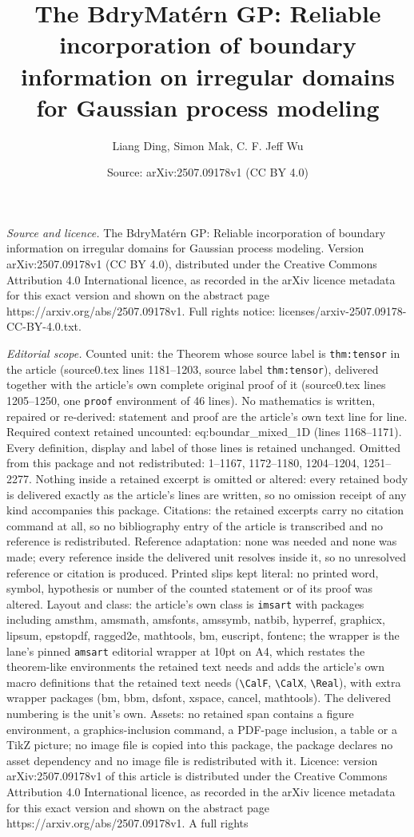 \documentclass[10pt,a4paper]{amsart}
\title[The BdryMat\'ern GP: Reliable incorporation of boundary info]{The BdryMat\'ern GP: Reliable incorporation of boundary information on irregular domains for Gaussian process modeling}
\author{Liang Ding, Simon Mak, C. F. Jeff Wu}
\date{Source: arXiv:2507.09178v1 (CC BY 4.0)}
\begin{document}
\maketitle

\noindent\emph{Source and licence.} The BdryMat\'ern GP: Reliable incorporation of boundary information on irregular domains for Gaussian process modeling. Version arXiv:2507.09178v1 (CC BY 4.0), distributed under the Creative Commons Attribution 4.0 International licence, as recorded in the arXiv licence metadata for this exact version and shown on the abstract page https://arxiv.org/abs/2507.09178v1. Full rights notice: licenses/arxiv-2507.09178-CC-BY-4.0.txt.\par\smallskip

\noindent\textit{Editorial scope.} Counted unit: the Theorem whose source label is \texttt{thm:tensor} in the article (source0.tex lines 1181--1203, source label \texttt{thm:tensor}), delivered together with the article's own complete original proof of it (source0.tex lines 1205--1250, one \texttt{proof} environment of 46 lines). No mathematics is written, repaired or re-derived: statement and proof are the article's own text line for line. Required context retained uncounted: eq:boundar\_mixed\_1D (lines 1168--1171). Every definition, display and label of those lines is retained unchanged. Omitted from this package and not redistributed: 1--1167, 1172--1180, 1204--1204, 1251--2277. Nothing inside a retained excerpt is omitted or altered: every retained body is delivered exactly as the article's lines are written, so no omission receipt of any kind accompanies this package. Citations: the retained excerpts carry no citation command at all, so no bibliography entry of the article is transcribed and no reference is redistributed. Reference adaptation: none was needed and none was made; every reference inside the delivered unit resolves inside it, so no unresolved reference or citation is produced. Printed slips kept literal: no printed word, symbol, hypothesis or number of the counted statement or of its proof was altered. Layout and class: the article's own class is \texttt{imsart} with packages including amsthm, amsmath, amsfonts, amssymb, natbib, hyperref, graphicx, lipsum, epstopdf, ragged2e, mathtools, bm, euscript, fontenc; the wrapper is the lane's pinned \texttt{amsart} editorial wrapper at 10pt on A4, which restates the theorem-like environments the retained text needs and adds the article's own macro definitions that the retained text needs (\texttt{\textbackslash CalF}, \texttt{\textbackslash CalX}, \texttt{\textbackslash Real}), with extra wrapper packages (bm, bbm, dsfont, xspace, cancel, mathtools). The delivered numbering is the unit's own. Assets: no retained span contains a figure environment, a graphics-inclusion command, a PDF-page inclusion, a table or a TikZ picture; no image file is copied into this package, the package declares no asset dependency and no image file is redistributed with it. Licence: version arXiv:2507.09178v1 of this article is distributed under the Creative Commons Attribution 4.0 International licence, as recorded in the arXiv licence metadata for this exact version and shown on the abstract page https://arxiv.org/abs/2507.09178v1. A full rights 
\end{document}
